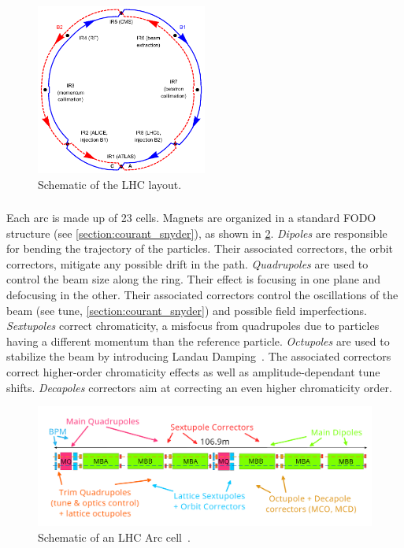 \begin{figure}[!htb]
    \centering
    \includegraphics[width=0.5\textwidth]{./images/irs.png}
    \caption{Schematic of the LHC layout.}
    \label{fig:introduction:lhc_irs}
\end{figure}


\subsubsection{}

Each arc is made up of 23 cells. Magnets are organized in a standard FODO structure
(see \ref{section:courant_snyder}), as shown in \cref{fig:introduction:lhc_arc_cell}.
\textit{Dipoles} are responsible for bending the trajectory of the particles. Their associated
correctors, the orbit correctors, mitigate any possible drift in the path.
\textit{Quadrupoles} are used to control the beam size along the ring. Their effect is focusing in
one plane and defocusing in the other. Their associated correctors control the oscillations of the
beam (see tune, \ref{section:courant_snyder}) and possible field imperfections.
\textit{Sextupoles} correct chromaticity, a misfocus from quadrupoles due to particles having
a different momentum than the reference particle.
\textit{Octupoles} are used to stabilize the beam by introducing Landau
Damping~\cite{gareyte_landau_1997}. The associated correctors correct higher-order chromaticity
effects as well as amplitude-dependant tune shifts.
\textit{Decapoles} correctors aim at correcting an even higher chromaticity order.

\begin{figure}[H]
    \centering
    \includegraphics[width=1\textwidth]{./images/lhc_cell.png}
    \caption{Schematic of an LHC Arc cell~\cite{bruning_lhc_2004}.}
    \label{fig:introduction:lhc_arc_cell}
\end{figure}



